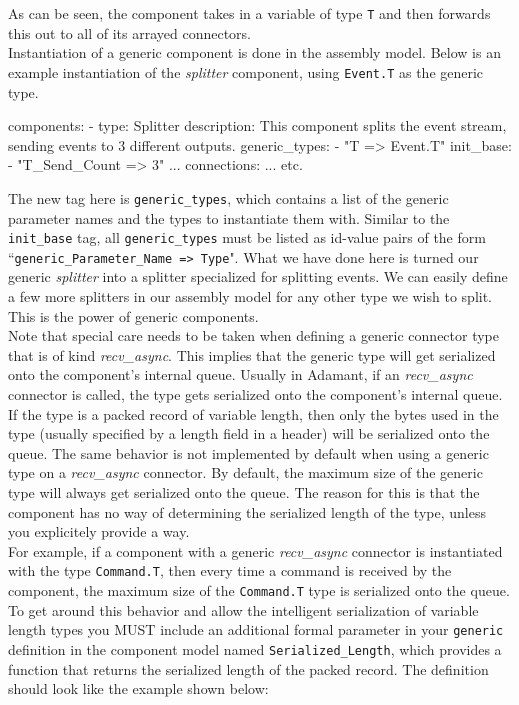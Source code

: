 As can be seen, the component takes in a variable of type \texttt{T} and then forwards this out to all of its arrayed connectors. \\

Instantiation of a generic component is done in the assembly model. Below is an example instantiation of the \textit{splitter} component, using \texttt{Event.T} as the generic type. 

\vspace{5mm} %
\begin{yamlcode}
components:
  - type: Splitter
    description: This component splits the event stream, sending events to 3 different outputs.
    generic_types:
      - "T => Event.T"
    init_base:
      - "T_Send_Count => 3"
  ... 
connections: 
  ...
  etc.
\end{yamlcode}
\vspace{5mm} %

The new tag here is \texttt{generic\_types}, which contains a list of the generic parameter names and the types to instantiate them with.  Similar to the \texttt{init\_base} tag, all \texttt{generic\_types} must be listed as id-value pairs of the form ``\texttt{generic\_Parameter\_Name => Type}". What we have done here is turned our generic \textit{splitter} into a splitter specialized for splitting events. We can easily define a few more splitters in our assembly model for any other type we wish to split. This is the power of generic components. \\

Note that special care needs to be taken when defining a generic connector type that is of kind \textit{recv\_async}. This implies that the generic type will get serialized onto the component's internal queue. Usually in Adamant, if an \textit{recv\_async} connector is called, the type gets serialized onto the component's internal queue. If the type is a packed record of variable length, then only the bytes used in the type (usually specified by a length field in a header) will be serialized onto the queue. The same behavior is not implemented by default when using a generic type on a \textit{recv\_async} connector. By default, the maximum size of the generic type will always get serialized onto the queue. The reason for this is that the component has no way of determining the serialized length of the type, unless you explicitely provide a way. \\

For example, if a component with a generic \textit{recv\_async} connector is instantiated with the type \texttt{Command.T}, then every time a command is received by the component, the maximum size of the \texttt{Command.T} type is serialized onto the queue. To get around this behavior and allow the intelligent serialization of variable length types you MUST include an additional formal parameter in your \texttt{generic} definition in the component model named \texttt{Serialized\_Length}, which provides a function that returns the serialized length of the packed record. The definition should look like the example shown below:

